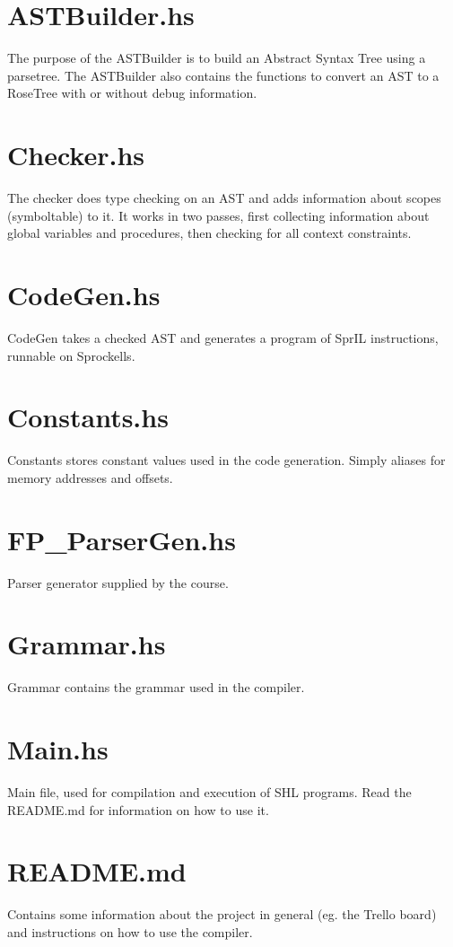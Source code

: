 \documentclass[twoside]{report}
\begin{document}
\section{ASTBuilder.hs}
The purpose of the ASTBuilder is to build an Abstract Syntax Tree using a parsetree. The ASTBuilder also contains the functions to convert an AST to a RoseTree with or without debug information.

\section{Checker.hs}
The checker does type checking on an AST and adds information about scopes (symboltable) to it. It works in two passes, first collecting information about global variables and procedures, then checking for all context constraints.

\section{CodeGen.hs}
CodeGen takes a checked AST and generates a program of SprIL instructions, runnable on Sprockells.

\section{Constants.hs}
Constants stores constant values used in the code generation. Simply aliases for memory addresses and offsets.

\section{FP\_{}ParserGen.hs}
Parser generator supplied by the course.

\section{Grammar.hs}
Grammar contains the grammar used in the compiler.

\section{Main.hs}
Main file, used for compilation and execution of SHL programs. Read the README.md for information on how to use it.

\section{README.md}
Contains some information about the project in general (eg. the Trello board) and instructions on how to use the compiler.
\end{document}
